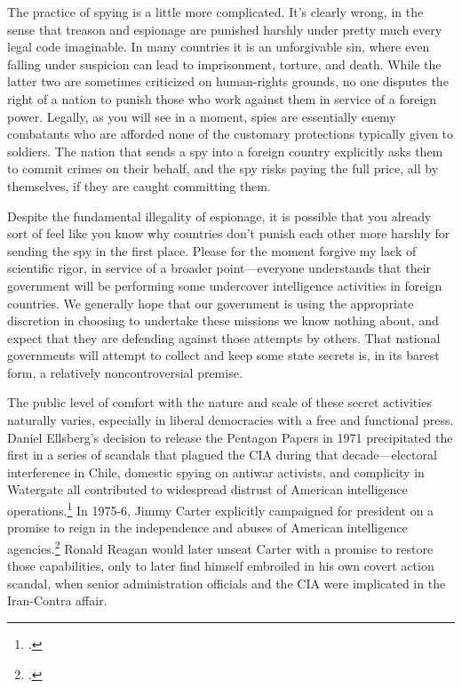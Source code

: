 \documentclass{report}
\begin{document}
\begin{refsegment}
The practice of spying is a little more complicated. It's clearly wrong, in the sense that treason and espionage are punished harshly under pretty much every legal code imaginable. In many countries it is an unforgivable sin, where even falling under suspicion can lead to imprisonment, torture, and death. While the latter two are sometimes criticized on human-rights grounds, no one disputes the right of a nation to punish those who work against them in service of a foreign power. Legally, as you will see in a moment, spies are essentially enemy combatants who are afforded none of the customary protections typically given to soldiers. The nation that sends a spy into a foreign country explicitly asks them to commit crimes on their behalf, and the spy risks paying the full price, all by themselves, if they are caught committing them.

Despite the fundamental illegality of espionage, it is possible that you already sort of feel like you know why countries don't punish each other more harshly for sending the spy in the first place. Please for the moment forgive my lack of scientific rigor, in service of a broader point---everyone understands that their government will be performing some undercover intelligence activities in foreign countries. We generally hope that our government is using the appropriate discretion in choosing to undertake these missions we know nothing about, and expect that they are defending against those attempts by others. That national governments will attempt to collect and keep some state secrets is, in its barest form, a relatively noncontroversial premise.

The public level of comfort with the nature and scale of these secret activities naturally varies, especially in liberal democracies with a free and functional press. Daniel Ellsberg's decision to release the Pentagon Papers in 1971 precipitated the first in a series of scandals that plagued the CIA during that decade---electoral interference in Chile, domestic spying on antiwar activists, and complicity in Watergate all contributed to widespread distrust of American intelligence operations.\footcite[p.~214-215]{andrew_missing_1984} In 1975-6, Jimmy Carter explicitly campaigned for president on a promise to reign in the independence and abuses of American intelligence agencies.\footcite[p.~217]{andrew_missing_1984} Ronald Reagan would later unseat Carter with a promise to restore those capabilities, only to later find himself embroiled in his own covert action scandal, when senior administration officials and the CIA were implicated in the Iran-Contra affair.


\end{refsegment}
\end{document}
